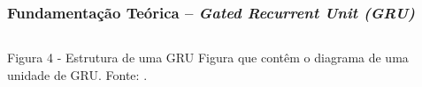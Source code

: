 \documentclass[aspectratio=169]{beamer}
\begin{document}
\begin{frame}[fragile] 
    \frametitle{Fundamentação Teórica -- \textit{Gated Recurrent Unit (GRU)}}
    \begin{columns}[c]
		\begin{column}{1\linewidth}
			\begin{figure}
				\label{fig:gruStr}
			\end{figure}

			\begin{block}{Figura 4 - Estrutura de uma GRU}
				Figura que contêm o diagrama de uma unidade de GRU. \newline Fonte: \cite{gru-image}.    
			\end{block}
		\end{column}
	\end{columns}
\end{frame}
\end{document}
